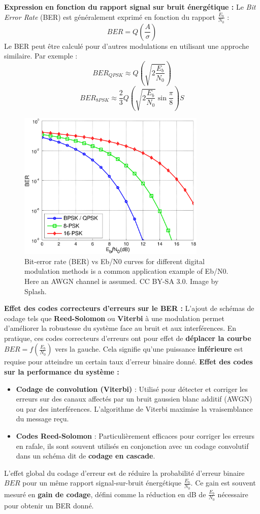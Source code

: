 \textbf{Expression en fonction du rapport signal sur bruit énergétique :}
Le \textit{Bit Error Rate} (BER) est généralement exprimé en fonction du rapport $\frac{E_b}{N_0}$ :
\[BER = Q \left(\frac{A}{\sigma} \right)\]
Le BER peut être calculé pour d'autres modulations en utilisant une approche similaire. Par exemple :
\[BER_{QPSK} \approx Q \left( \sqrt{2 \frac{E_b}{N_0}} \right)\]
\[BER_{8PSK} \approx \frac{2}{3} Q \left( \sqrt{2 \frac{E_b}{N_0}} \sin \frac{\pi}{8} \right)S\]
\begin{figure}[H] %
    \centering
    \includegraphics[width=0.8\textwidth]{figures/6-50.png}
    \caption{Bit-error rate (BER) vs Eb/N0 curves for different digital modulation methods is a common application example of Eb/N0. Here an AWGN channel is assumed. CC BY-SA 3.0. Image by Splash.}
    \label{fig:communication2}
\end{figure}
\textbf{Effet des codes correcteurs d'erreurs sur le BER :}
L'ajout de schémas de codage tels que \textbf{Reed-Solomon} ou \textbf{Viterbi} à une modulation permet d'améliorer la robustesse du système face au bruit et aux interférences. En pratique, ces codes correcteurs d'erreurs ont pour effet de \textbf{déplacer la courbe} $BER = f(\tfrac{E_b}{N_0})$ vers la gauche. Cela signifie qu'une puissance \textbf{inférieure} est requise pour atteindre un certain taux d'erreur binaire donné.
\textbf{Effet des codes sur la performance du système :}
\begin{itemize}
    \item \textbf{Codage de convolution (Viterbi)} : Utilisé pour détecter et corriger les erreurs sur des canaux affectés par un bruit gaussien blanc additif (AWGN) ou par des interférences. L'algorithme de Viterbi maximise la vraisemblance du message reçu.
    \item \textbf{Codes Reed-Solomon} : Particulièrement efficaces pour corriger les erreurs en rafale, ils sont souvent utilisés en conjonction avec un codage convolutif dans un schéma dit de \textbf{codage en cascade}.
\end{itemize}
L'effet global du codage d'erreur est de réduire la probabilité d'erreur binaire $BER$ pour un même rapport signal-sur-bruit énergétique $\tfrac{E_b}{N_0}$. Ce gain est souvent mesuré en \textbf{gain de codage}, défini comme la réduction en dB de $\tfrac{E_b}{N_0}$ nécessaire pour obtenir un BER donné.
